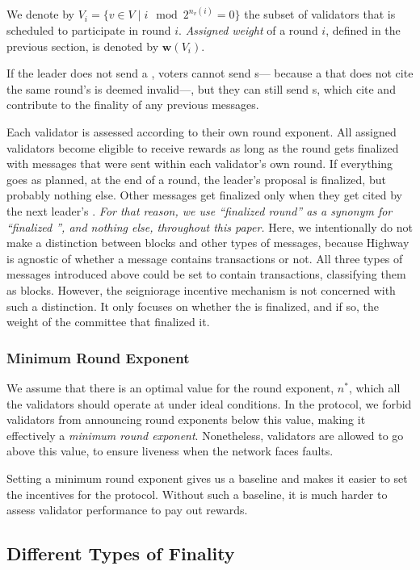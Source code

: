 We denote by $V_{i}=\{v\in V \mid i \mod 2^{n_v(i)} = 0\}$ the subset of validators that is scheduled to participate in round $i$. \emph{Assigned weight} of a round $i$, defined in the previous section, is denoted by $\boldsymbol{w}(V_i)$.

If the leader does not send a \PROP, voters cannot send \CONF{}s--- because a \CONF that does not cite the same round's \PROP is deemed invalid---, but they can still send \WIT{}s, which cite and contribute to the finality of any previous messages.

Each validator is assessed according to their own round exponent. All assigned validators become eligible to receive rewards as long as the round gets finalized with messages that were sent within each validator's own round. If everything goes as planned, at the end of a round, the leader's proposal is finalized, but probably nothing else. Other messages get finalized only when they get cited by the next leader's \PROP. \emph{For that reason, we use ``finalized round'' as a synonym for ``finalized \PROP'', and nothing else, throughout this paper.} Here, we intentionally do not make a distinction between blocks and other types of messages, because Highway is agnostic of whether a message contains transactions or not. All three types of messages introduced above could be set to contain transactions, classifying them as blocks. However, the seigniorage incentive mechanism is not concerned with such a distinction. It only focuses on whether the \PROP is finalized, and if so, the weight of the committee that finalized it.

\subsubsection*{Minimum Round Exponent}

We assume that there is an optimal value for the round exponent, $n^\ast$, which all the validators should operate at under ideal conditions. In the protocol, we forbid validators from announcing round exponents below this value, making it effectively a \emph{minimum round exponent}. Nonetheless, validators are allowed to go above this value, to ensure liveness when the network faces faults.

Setting a minimum round exponent gives us a baseline and makes it easier to set the incentives for the protocol. Without such a baseline, it is much harder to assess validator performance to pay out rewards.


\subsection{Different Types of Finality}
\label{sec:finality-types}

